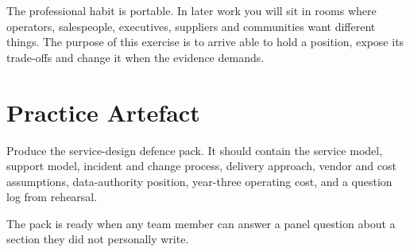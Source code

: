 The professional habit is portable. In later work you will sit in rooms where operators, salespeople, executives, suppliers and communities want different things. The purpose of this exercise is to arrive able to hold a position, expose its trade-offs and change it when the evidence demands.

\section{Practice Artefact}

Produce the service-design defence pack. It should contain the service model, support model, incident and change process, delivery approach, vendor and cost assumptions, data-authority position, year-three operating cost, and a question log from rehearsal.


The pack is ready when any team member can answer a panel question about a section they did not personally write.
